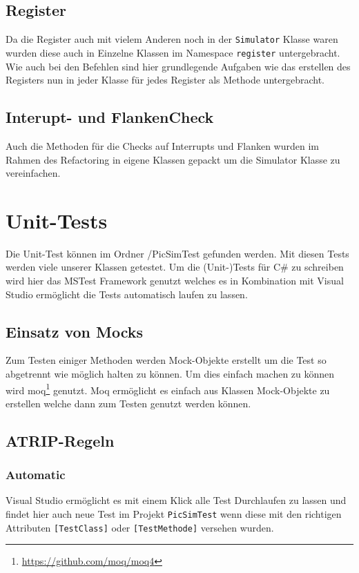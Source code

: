 \documentclass[12pt,a4paper,titlepage,ngerman,pdftex]{report}
\begin{document}
    \subsection{Register}
    Da die Register auch mit vielem Anderen noch in der \verb|Simulator| Klasse  waren wurden diese auch in Einzelne Klassen im Namespace \verb|register| untergebracht. 
    Wie auch bei den Befehlen sind hier grundlegende Aufgaben wie das erstellen des Registers nun in jeder Klasse für jedes Register als Methode untergebracht.
    \subsection{Interupt- und FlankenCheck}
   Auch die Methoden für die Checks auf Interrupts und Flanken wurden im Rahmen des Refactoring in eigene Klassen gepackt um die Simulator Klasse zu vereinfachen.
   
   
   \section{Unit-Tests}
    Die Unit-Test können im Ordner /PicSimTest gefunden werden. 
	Mit diesen Tests werden viele unserer Klassen getestet.
	Um die (Unit-)Tests für C\# zu schreiben wird hier das MSTest Framework genutzt welches es in Kombination mit Visual Studio ermöglicht die Tests automatisch laufen zu lassen.

    \subsection{Einsatz von Mocks}
    Zum Testen einiger Methoden werden Mock-Objekte erstellt um die Test so abgetrennt wie möglich halten zu können.
	Um dies einfach machen zu können wird moq\footnote{\url{https://github.com/moq/moq4}} genutzt.
	Moq ermöglicht es einfach aus Klassen Mock-Objekte zu erstellen welche dann zum Testen genutzt werden können.
	
    \subsection{ATRIP-Regeln}
	\label{subsec:atrip-regeln}

    \subsubsection{Automatic}
	Visual Studio ermöglicht es mit einem Klick alle Test Durchlaufen zu lassen und findet hier auch neue Test im Projekt \verb|PicSimTest| wenn diese mit den richtigen Attributen \verb|[TestClass]| oder \verb|[TestMethode]| versehen wurden.
	
\end{document}
